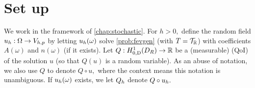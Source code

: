 
\section{Set up}

We work in the framework of \cref{chap:stochastic}. For $h>0,$ define the random field $u_{h}:\Omega \rightarrow V_{h,p}$ by letting $u_{h}(\omega)$ solve \cref{prob:fevgen} (with $T = \mathcal T_{\mathbb R}$) with coefficients $A(\omega)$ and $n(\omega)$ (if it exists). Let $Q:\HozDDR\rightarrow\RR$ be a (measurable)  (QoI) of the solution $u$ (so that $Q(u)$ is a random variable). As an abuse of notation, we also use $Q$ to denote $Q \circ u,$ where the context means this notation is unambiguous. If $u_{h}(\omega)$ exists, we let $Q_{h}$ denote $Q \circ u_{h}.$

